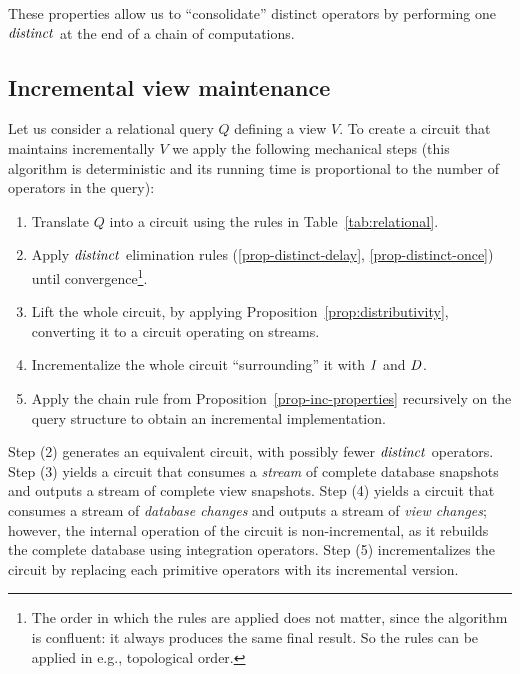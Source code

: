These properties allow us to ``consolidate'' distinct operators by performing
one $\mathit{distinct}$ at the end of a chain of computations.

\subsection{Incremental view maintenance}

Let us consider a relational query $Q$ defining a view $V$.  To create
a circuit that maintains incrementally $V$ we apply the following
mechanical steps (this algorithm is deterministic and its running time
is proportional to the number of operators in the query):

\begin{algorithm}\label{algorithm-inc}\quad
\begin{enumerate}[nosep, leftmargin=\parindent]
    \item Translate $Q$ into a circuit using the rules in Table~\ref{tab:relational}.
    \item Apply $\mathit{distinct}$ elimination rules (\ref{prop-distinct-delay}, \ref{prop-distinct-once}) until convergence\footnote{The
    order in which the rules are applied does not matter, since the algorithm is
    confluent: it always produces the same final result. So the rules
    can be applied in e.g., topological order.}.
    \item Lift the whole circuit, by applying Proposition~\ref{prop:distributivity},
    converting it to a circuit operating on streams.
    \item Incrementalize the whole circuit ``surrounding'' it with $\mathit{I}$ and $\mathit{D}$.
    \item Apply the chain rule
    from Proposition~\ref{prop-inc-properties} recursively on the query structure
    to obtain an incremental implementation.
\end{enumerate}
\end{algorithm}

Step (2) generates an equivalent circuit, with possibly fewer
$\mathit{distinct}$ operators.  Step (3) yields a circuit that consumes a
\emph{stream} of complete database snapshots and outputs a stream of
complete view snapshots. Step (4) yields a circuit that consumes a
stream of \emph{database changes} and outputs a stream of \emph{view
changes}; however, the internal operation of the circuit is
non-incremental, as it rebuilds the complete database using
integration operators.  Step (5) incrementalizes the circuit by
replacing each primitive operators with its incremental version.

